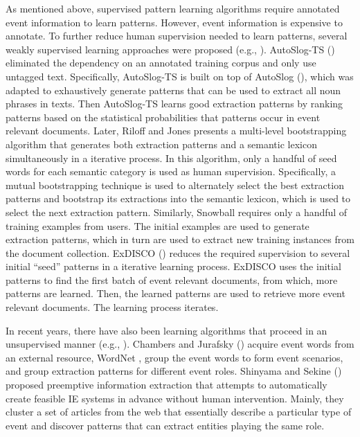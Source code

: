 As mentioned above, supervised pattern learning algorithms 
require 
annotated event information to learn patterns. 
However, 
event information 
is 
expensive to annotate. 
To further reduce human supervision needed to 
learn patterns, several weakly supervised learning 
approaches were proposed (e.g.,
\cite{riloff-aaai96,riloff-aaai99,yangarber00,sudo03,stevenson05}). 
AutoSlog-TS (\cite{riloff-aaai96}) 
eliminated the dependency on an annotated 
training corpus and only use untagged text. 
Specifically, AutoSlog-TS is built on top of 
AutoSlog (\cite{autoslog-aaai93}), which was 
adapted to exhaustively generate patterns 
that can be used to extract all noun phrases in texts. 
Then AutoSlog-TS learns good extraction 
patterns by ranking patterns based on the 
statistical probabilities that patterns occur 
in event relevant documents. 
Later, Riloff and Jones \cite{riloff-aaai99} 
presents a multi-level bootstrapping 
algorithm that generates 
both extraction patterns 
and a semantic lexicon 
simultaneously in a iterative process. 
In this algorithm, only a handful of seed words 
for each semantic category 
is used as human supervision. 
Specifically, a mutual bootstrapping 
technique is used to alternately select 
the best extraction patterns and bootstrap 
its extractions into the semantic lexicon, 
which is used to select the next extraction pattern. 
Similarly, Snowball \cite{agichtein00} 
requires only a handful of training examples
from users. 
The initial examples are 
used to generate extraction patterns, which 
in turn are used to extract 
new training instances from the document collection. 
ExDISCO (\cite{yangarber00}) 
reduces the required supervision to 
several initial ``seed'' patterns 
in a iterative learning process.  
ExDISCO uses the initial patterns to find 
the first batch of event relevant documents, 
from which, more patterns are learned. 
Then, the learned patterns are used to retrieve 
more event relevant documents. 
The learning process iterates. 

In recent years, there have also been learning algorithms that 
proceed in an unsupervised manner (e.g., \cite{Chambers11,shinyama06,sekine06}). 
Chambers and Jurafsky (\cite{Chambers11}) acquire event words from an external
resource, WordNet \cite{miller90}, 
group the event words to form event scenarios, and group
extraction patterns for different event roles. 
Shinyama and Sekine (\cite{shinyama06}) proposed  
preemptive information extraction that attempts to 
automatically create 
feasible IE systems in advance 
without human intervention. 
Mainly, they cluster a set of articles from 
the web that essentially describe a particular type of event 
and discover patterns that can extract entities 
playing the same role.


